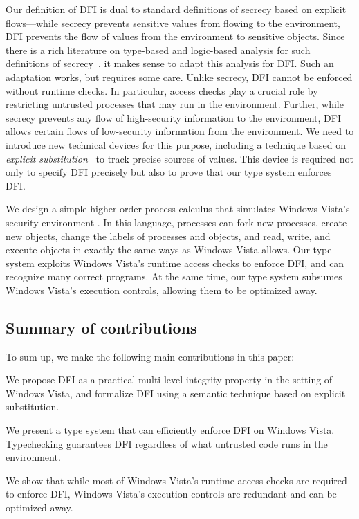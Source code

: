 \documentclass{sigplanconf}
\newenvironment{compact}
        {\begin{list}{}{
}}
        {\end{list}}
\begin{document}
Our definition of DFI is dual to standard definitions of
secrecy based on explicit flows---while secrecy prevents sensitive values from
flowing to the environment, DFI prevents the flow of values from the environment to sensitive objects.  Since
there is a rich literature on type-based and logic-based analysis for such definitions of secrecy~\cite{secgp,sectyplog,runtimeprin,ChaudhuriConcur06}, it
makes sense to adapt this analysis for DFI. Such an adaptation works, but requires some care.
Unlike secrecy, DFI cannot be enforced without runtime checks. In particular, access checks play a crucial role by
restricting untrusted processes that may run in the environment.  
Further, while secrecy prevents any flow of high-security information to the environment,  
DFI allows certain flows of low-security information from the environment. We need to introduce new technical devices for this purpose, including a technique based on \emph{explicit
substitution}~\cite{abadi90explicit} to track precise sources of values. This device is required not only to
specify DFI precisely but also to prove that our type system
enforces DFI.


We design a simple higher-order process calculus that simulates Windows Vista's security environment \cite{bppvista,symantec,uac}. In this language,  processes can fork new processes, create new objects, change the labels of processes and objects, and read, write, and execute objects in exactly the same ways as Windows Vista allows. 
Our type system exploits Windows Vista's runtime access checks to enforce DFI, and can recognize many correct programs. At the same time, our type system subsumes Windows Vista's execution controls, allowing them to be optimized away.


\subsection{Summary of contributions} To sum up, we make the following main contributions in this paper:\begin{compact}
\item
We propose DFI as a practical multi-level integrity property in the setting of Windows Vista, and formalize DFI using a semantic technique based on explicit substitution.
\item
We present a type system that can efficiently enforce DFI on Windows Vista. Typechecking guarantees DFI regardless 
of what untrusted code runs in the environment. \item
We show that while most of Windows Vista's runtime access checks are required to enforce DFI, Windows Vista's execution controls are redundant and can be optimized away.
\end{compact}
\end{document}
